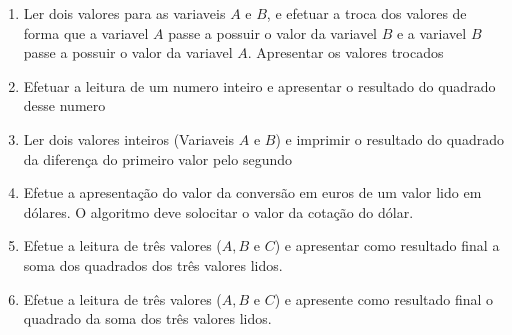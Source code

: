 \documentclass{article}
\begin{document}
\begin{enumerate}
    \\
    \item Ler dois valores para as variaveis $A$ e $B$, e efetuar a troca dos valores de forma que a variavel $A$ passe a possuir o valor da variavel $B$ e a variavel $B$ passe a possuir o valor da variavel $A$. Apresentar os valores trocados
    \\
    \item Efetuar a leitura de um numero inteiro e apresentar o resultado do quadrado desse numero
    \\
    \item Ler dois valores inteiros (Variaveis $A$ e $B$) e imprimir o resultado do quadrado da diferença do primeiro valor pelo segundo
    \\
    \item Efetue a apresentação do valor da conversão em euros de um valor lido em dólares. O algoritmo deve solocitar o valor da cotação do dólar.
    \\
    \item Efetue a leitura de três valores ($A,B$ e $C$) e apresentar como resultado final a soma dos quadrados dos três valores lidos.
    \\
    \item Efetue a leitura de três valores ($A,B$ e $C$) e apresente como resultado final o quadrado da soma dos três valores lidos.
    
\end{enumerate}
\end{document}
